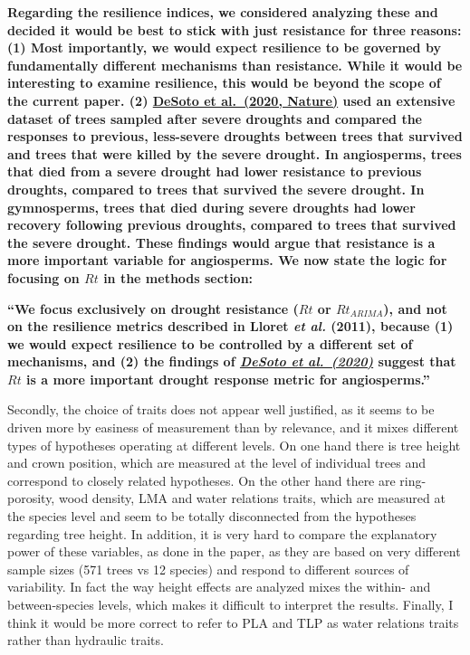 \documentclass[
]{article}
\begin{document}
\textbf{Regarding the resilience indices, we considered analyzing these
and decided it would be best to stick with just resistance for three
reasons: (1) Most importantly, we would expect resilience to be governed
by fundamentally different mechanisms than resistance. While it would be
interesting to examine resilience, this would be beyond the scope of the
current paper. (2)
\href{https://www.nature.com/articles/s41467-020-14300-5}{DeSoto et
al.~(2020, Nature)} used an extensive dataset of trees sampled after
severe droughts and compared the responses to previous, less-severe
droughts between trees that survived and trees that were killed by the
severe drought. In angiosperms, trees that died from a severe drought
had lower resistance to previous droughts, compared to trees that
survived the severe drought. In gymnosperms, trees that died during
severe droughts had lower recovery following previous droughts, compared
to trees that survived the severe drought. These findings would argue
that resistance is a more important variable for angiosperms. We now
state the logic for focusing on \(Rt\) in the methods section:}

\textbf{``We focus exclusively on drought resistance (\(Rt\) or
\(Rt_{ARIMA}\)), and not on the resilience metrics described in Lloret
\emph{et al.} (2011), because (1) we would expect resilience to be
controlled by a different set of mechanisms, and (2) the findings of
\emph{\href{https://www.nature.com/articles/s41467-020-14300-5}{DeSoto
et al.~(2020)}} suggest that \(Rt\) is a more important drought response
metric for angiosperms.''}

Secondly, the choice of traits does not appear well justified, as it
seems to be driven more by easiness of measurement than by relevance,
and it mixes different types of hypotheses operating at different
levels. On one hand there is tree height and crown position, which are
measured at the level of individual trees and correspond to closely
related hypotheses. On the other hand there are ring-porosity, wood
density, LMA and water relations traits, which are measured at the
species level and seem to be totally disconnected from the hypotheses
regarding tree height. In addition, it is very hard to compare the
explanatory power of these variables, as done in the paper, as they are
based on very different sample sizes (571 trees vs 12 species) and
respond to different sources of variability. In fact the way height
effects are analyzed mixes the within- and between-species levels, which
makes it difficult to interpret the results. Finally, I think it would
be more correct to refer to PLA and TLP as water relations traits rather
than hydraulic traits.
\end{document}
